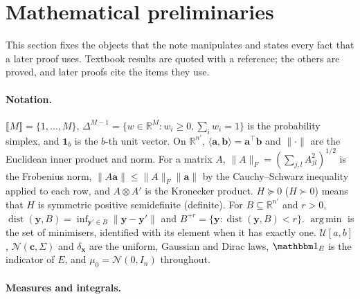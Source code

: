 \documentclass{article}
\DeclareMathOperator*{\argmin}{arg\,min}
\DeclareMathOperator{\dist}{dist}
\newcommand{\RR}{\mathbb{R}}
\newcommand{\cN}{\mathcal{N}}
\newcommand{\bx}{\mathbf{x}}
\newcommand{\by}{\mathbf{y}}
\newcommand{\bb}{\mathbf{b}}
\newcommand{\ba}{\mathbf{a}}
\theoremstyle{plain}
\theoremstyle{remark}
\begin{document}
\section{Mathematical preliminaries}\label{sec:math}

This section fixes the objects that the note manipulates and states every fact that a later proof uses. Textbook
results are quoted with a reference; the others are proved, and later proofs cite the items they use.

\paragraph{Notation.}
$\llbracket M\rrbracket=\{1,\dots,M\}$, $\Delta^{M-1}=\{w\in\RR^M:w_i\ge0,\sum_iw_i=1\}$ is the probability simplex, and $\mathbf 1_b$ is the
$b$-th unit vector. On $\RR^{n'}$, $\langle\ba,\bb\rangle=\ba^\top\bb$ and $\|\cdot\|$ are the Euclidean inner product and norm. For a matrix
$A$, $\|A\|_F=(\sum_{j,l}A_{jl}^2)^{1/2}$ is the Frobenius norm, $\|A\ba\|\le\|A\|_F\|\ba\|$ by the Cauchy--Schwarz inequality applied to each
row, and $A\otimes A'$ is the Kronecker product. $H\succeq0$ ($H\succ0$) means that $H$ is symmetric positive semidefinite (definite). For
$B\subseteq\RR^{n'}$ and $r>0$, $\dist(\by,B)=\inf_{\by'\in B}\|\by-\by'\|$ and $B^{+r}=\{\by:\dist(\by,B)<r\}$. $\argmin$ is the set of
minimisers, identified with its element when it has exactly one. $\mathcal U[a,b]$, $\cN(\mathbf c,\Sigma)$ and $\delta_\bx$ are the uniform,
Gaussian and Dirac laws, $\mathbbm 1_E$ is the indicator of $E$, and $\mu_0=\cN(0,I_n)$ throughout.

\paragraph{Measures and integrals.}
\end{document}
